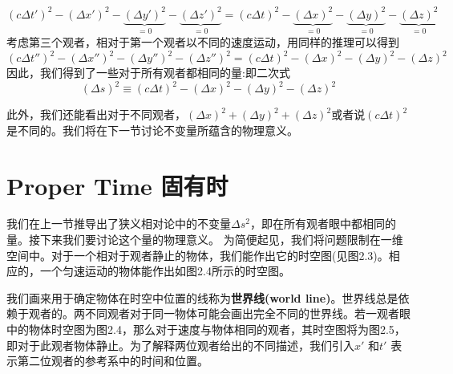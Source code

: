 \begin{equation}\label{eq2.11}
\left( c \Delta t' \right)^2
-\left(\Delta x' \right)^2
-\underbrace{\left(\Delta y' \right)^2}_{=0}
-\underbrace{\left(\Delta z' \right)^2}_{=0}
=
\left( c \Delta t \right)^2
-\underbrace{\left(\Delta x \right)^2}_{=0}
-\underbrace{\left(\Delta y \right)^2}_{=0}
-\underbrace{\left(\Delta z \right)^2}_{=0}
\end{equation}
考虑第三个观者，相对于第一个观者以不同的速度运动，用同样的推理可以得到
\begin{equation}\label{eq2.12}
\left( c \Delta t'' \right)^2
-\left(\Delta x'' \right)^2
-\left(\Delta y'' \right)^2
-\left(\Delta z'' \right)^2
=
\left( c \Delta t \right)^2
-\left(\Delta x \right)^2
-\left(\Delta y \right)^2
-\left(\Delta z \right)^2
\end{equation}
因此，我们得到了一些对于所有观者都相同的量:即二次式
\begin{equation}\label{eq2.13}
(\Delta s)^2
\equiv\left( c \Delta t \right)^2
-\left(\Delta x \right)^2
-\left(\Delta y \right)^2
-\left(\Delta z \right)^2
\end{equation}

此外，我们还能看出对于不同观者，$(\Delta x)^2+(\Delta y)^2+(\Delta z)^2$或者说$(c\Delta t)^2$是不同的。我们将在下一节讨论不变量所蕴含的物理意义。


\section[固有时]{Proper Time 固有时}
\label{sec2.2}
我们在上一节推导出了狭义相对论中的不变量$\Delta s^2$，即在所有观者眼中都相同的量。接下来我们要讨论这个量的物理意义。
为简便起见，我们将问题限制在一维空间中。对于一个相对于观者静止的物体，我们能作出它的时空图(见图2.3)。相应的，一个匀速运动的物体能作出如图2.4所示的时空图。

我们画来用于确定物体在时空中位置的线称为{\bf{世界线(world line)}}。世界线总是依赖于观者的。两不同观者对于同一物体可能会画出完全不同的世界线。若一观者眼中的物体时空图为图2.4，那么对于速度与物体相同的观者，其时空图将为图2.5，即对于此观者物体静止。为了解释两位观者给出的不同描述，我们引入$x'$ 和$t'$ 表示第二位观者的参考系中的时间和位置。

